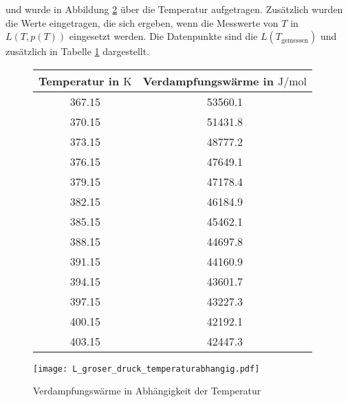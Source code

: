 und wurde in Abbildung \ref{fig:L_groser_druck_temperaturabhangig} über die Temperatur aufgetragen. Zusätzlich wurden die Werte eingetragen, die sich ergeben, wenn die Messwerte von $T$ in $L(T, p(T))$ eingesetzt werden. Die Datenpunkte sind die $L(T_\text{gemessen})$ und zusätzlich in Tabelle \ref{tab:verdampfungswarme} dargestellt. 
\begin{figure}[h!]
	\centering
\begin{tabular}{c|c}
	Temperatur in $\si{\kelvin}$ &   Verdampfungswärme in $\si{\joule\per\mol}$ \\
	\hline
	367.15 &                                      53560.1 \\
	370.15 &                                      51431.8 \\
	373.15 &                                      48777.2 \\
	376.15 &                                      47649.1 \\
	379.15 &                                      47178.4 \\
	382.15 &                                      46184.9 \\
	385.15 &                                      45462.1 \\
	388.15 &                                      44697.8 \\
	391.15 &                                      44160.9 \\
	394.15 &                                      43601.7 \\
	397.15 &                                      43227.3 \\
	400.15 &                                      42192.1 \\
	403.15 &                                      42447.3 \\
\end{tabular}
	\label{tab:verdampfungswarme}
\end{figure}





\begin{figure}[h!]
	\centering
	\texttt{[image: L\_groser\_druck\_temperaturabhangig.pdf]}
	\caption{Verdampfungswärme in Abhängigkeit der Temperatur}
	\label{fig:L_groser_druck_temperaturabhangig}
\end{figure}






